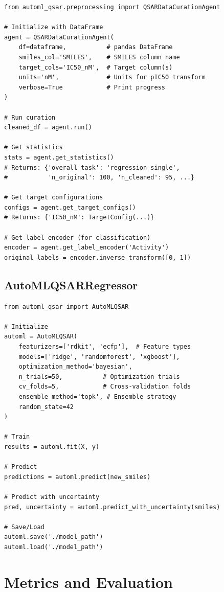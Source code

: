 \documentclass[11pt,a4paper]{article}
\begin{document}
\begin{lstlisting}[caption={Data Curation Usage}]
from automl_qsar.preprocessing import QSARDataCurationAgent

# Initialize with DataFrame
agent = QSARDataCurationAgent(
    df=dataframe,           # pandas DataFrame
    smiles_col='SMILES',    # SMILES column name
    target_cols='IC50_nM',  # Target column(s)
    units='nM',             # Units for pIC50 transform
    verbose=True            # Print progress
)

# Run curation
cleaned_df = agent.run()

# Get statistics
stats = agent.get_statistics()
# Returns: {'overall_task': 'regression_single', 
#           'n_original': 100, 'n_cleaned': 95, ...}

# Get target configurations
configs = agent.get_target_configs()
# Returns: {'IC50_nM': TargetConfig(...)}

# Get label encoder (for classification)
encoder = agent.get_label_encoder('Activity')
original_labels = encoder.inverse_transform([0, 1])
\end{lstlisting}

\subsection{AutoMLQSARRegressor}

\begin{lstlisting}[caption={AutoML Pipeline Usage}]
from automl_qsar import AutoMLQSAR

# Initialize
automl = AutoMLQSAR(
    featurizers=['rdkit', 'ecfp'],  # Feature types
    models=['ridge', 'randomforest', 'xgboost'],
    optimization_method='bayesian',
    n_trials=50,           # Optimization trials
    cv_folds=5,            # Cross-validation folds
    ensemble_method='topk', # Ensemble strategy
    random_state=42
)

# Train
results = automl.fit(X, y)

# Predict
predictions = automl.predict(new_smiles)

# Predict with uncertainty
pred, uncertainty = automl.predict_with_uncertainty(smiles)

# Save/Load
automl.save('./model_path')
automl.load('./model_path')
\end{lstlisting}

\section{Metrics and Evaluation}
\end{document}
